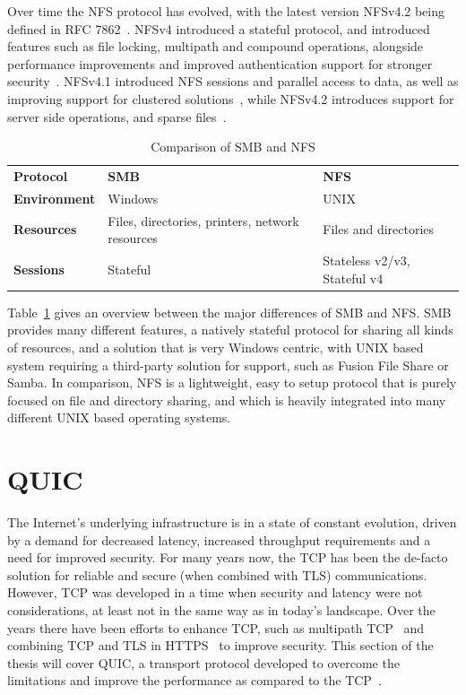 \documentclass[english, 12pt, a4paper, elec, utf8, a-2b, online]{aaltothesis}
\begin{document}
Over time the NFS protocol has evolved, with the latest version NFSv4.2 being
defined in RFC 7862~\cite{rfc7862}. NFSv4 introduced a stateful protocol, and
introduced features such as file locking, multipath and compound operations, alongside performance
improvements and improved authentication support for stronger security~\cite{rfc7530}.
NFSv4.1 introduced NFS sessions and parallel access to data, as well as improving support
for clustered solutions~\cite{rfc8881}, while
NFSv4.2 introduces support for server side operations, and sparse files~\cite{rfc7862}.

\begin{table}[h]
	\centering
	\caption{Comparison of SMB and NFS}
	\label{tab:smb_nfs}
	\begin{tabular}{lll}
	\textbf{Protocol} & \textbf{SMB} & \textbf{NFS} \\
	\textbf{Environment}    & Windows     & UNIX    \\
	\textbf{Resources} &  Files, directories, printers, network resources   & Files and directories     \\
	\textbf{Sessions}  & Stateful  & Stateless v2/v3, Stateful v4    \\
	\end{tabular}
\end{table}

Table~\ref{tab:smb_nfs} gives an overview between the major differences of SMB and
NFS. SMB provides many different features, a natively stateful protocol for sharing
all kinds of resources, and a solution that is very Windows centric, with UNIX based
system requiring a third-party solution for support, such as Fusion File Share or
Samba. In comparison, NFS is a lightweight, easy to setup protocol that is purely
focused on file and directory sharing, and which is heavily integrated into many
different UNIX based operating systems.
\clearpage

\section{QUIC}
\label{sec:quic}
The Internet's underlying infrastructure is in a state of constant evolution,
driven by a demand for decreased latency, increased throughput requirements and
a need for improved security. For many years now, the TCP has been the de-facto
solution for reliable and secure (when combined with TLS) communications. However,
TCP was developed in a time when security and latency were not considerations,
at least not in the same way as in today's landscape. Over the years there have
been efforts to enhance TCP, such as multipath TCP~\cite{rfc8684} and combining
TCP and TLS in HTTPS~\cite{rfc2818} to improve security. This section of the thesis
will cover QUIC, a transport protocol developed to overcome the limitations and
improve the performance as compared to the TCP~\cite{quic_transport_protocol_design}.
\end{document}
